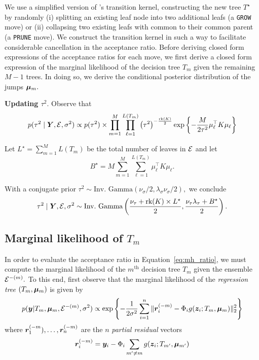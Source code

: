 We use a simplified version of \citet{Chipman1998}'s transition kernel, constructing the new tree $T^{\star}$ by randomly (i) splitting an existing leaf node into two additional leafs (a \texttt{GROW} move) or (ii) collapsing two existing leafs with common to their common parent (a \texttt{PRUNE} move).
We construct the transition kernel in such a way to facilitate considerable cancellation in the acceptance ratio.
Before deriving closed form expressions of the acceptance ratios for each move, we first derive a closed form expression of the marginal likelihood of the decision tree $T_{m}$ given the remaining $M - 1$ trees.
In doing so, we derive the conditional posterior distribution of the jumps $\boldsymbol{\mu}_{m}.$

\textbf{Updating $\tau^{2}$}. Observe that
$$
p(\tau^{2} \mid \bm{Y}, \mathcal{E}, \sigma^{2}) \propto p(\tau^{2}) \times \prod_{m = 1}^{M}{\prod_{\ell = 1}^{L(T_{m})}{\left(\tau^{2}\right)^{-\frac{\text{rk}(K)}{2}}\exp\left\{-\frac{M}{2\tau^{2}}\mu_{\ell}^{\top}K\mu_{\ell}\right\}}}
$$

Let $L^{\star} = \sum_{m = 1}^{M}{L(T_{m})}$ be the total number of leaves in $\mathcal{E}$ and let 
$$
B^{\star} = M\sum_{m = 1}^{M}{\sum_{\ell = 1}^{L(T_{m})}{\mu_{\ell}^{\top}K\mu_{\ell}}}.
$$

With a conjugate prior $\tau^{2} \sim \text{Inv.~Gamma}(\nu_{\sigma}/2, \lambda_{\sigma}\nu_{\sigma}/2),$ we conclude 
$$
\tau^{2} \mid \bm{Y}, \mathcal{E}, \sigma^{2} \sim \text{Inv.~Gamma}\left(\frac{\nu_{\tau} + \text{rk}(K)\times L^{\star}}{2}, \frac{\nu_{\tau}\lambda_{\tau} + B^{\star}}{2}\right).
$$

\subsection{Marginal likelihood of $T_{m}$}

In order to evaluate the acceptance ratio in Equation~\eqref{eq:mh_ratio}, we must compute the marginal likelihood of the $m^{\text{th}}$ decision tree $T_{m}$ given the ensemble $\mathcal{E}^{-(m)}.$
To this end, first observe that the marginal likelihood of the \textit{regression tree} $(T_{m}, \boldsymbol{\mu}_{m})$ is given by
\begin{equation}
\label{eq:reg_tree_likelihood1}
p(\bm{y} \vert T_{m}, \boldsymbol{\mu}_{m}, \mathcal{E}^{-(m)}, \sigma^{2}) \propto \exp\left\{-\frac{1}{2\sigma^{2}}\sum_{i = 1}^{n}{\lVert \bm{r}_{i}^{(-m)} - \Phi_{i}g(\bm{z}_{i}; T_{m}, \boldsymbol{\mu}_{m})\rVert_{2}^{2}}\right\}
\end{equation}
where $\bm{r}_{1}^{(-m}), \ldots, \bm{r}_{n}^{(-m)}$ are the $n$ \textit{partial residual} vectors
$$
\bm{r}_{i}^{(-m)} = \bm{y}_{i} - \Phi_{i}\sum_{m' \neq m}{g(\bm{z}_{i}; T_{m'}, \boldsymbol{\mu}_{m'})}
$$

